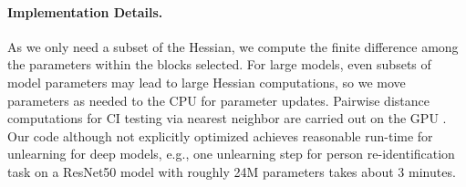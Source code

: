 \paragraph{Implementation Details.}
As we only need a subset of the Hessian, we compute the finite difference among the parameters within the blocks selected.
For large models, even subsets of model parameters may lead to large Hessian computations, so we move parameters as needed to the CPU for parameter updates. Pairwise distance computations for CI testing via nearest neighbor are carried out on the GPU \cite{yoso-zhanpeng}.
Our code although not explicitly optimized achieves reasonable run-time for unlearning for deep models, e.g., one unlearning step for person re-identification task on a ResNet50 model with roughly 24M parameters takes about 3 minutes.  



